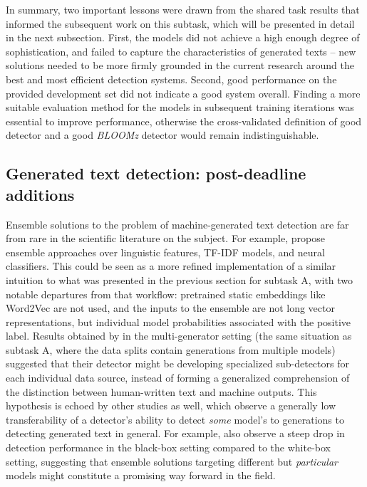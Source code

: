 In summary, two important lessons were drawn from the shared task results that informed the subsequent work on this subtask, which will be presented in detail in the next subsection.
First, the models did not achieve a high enough degree of sophistication, and failed to capture the characteristics of generated texts -- new solutions needed to be more firmly grounded in the current research around the best and most efficient detection systems.
Second, good performance on the provided development set did not indicate a good system overall.
Finding a more suitable evaluation method for the models in subsequent training iterations was essential to improve performance, otherwise the cross-validated definition of good detector and a good \emph{BLOOMz} detector would remain indistinguishable.

\subsection{Generated text detection: post-deadline additions}

Ensemble solutions to the problem of machine-generated text detection are far from rare in the scientific literature on the subject.
For example, \citet{frohling2021feature} propose ensemble approaches over linguistic features, TF-IDF models, and neural classifiers.
This could be seen as a more refined implementation of a similar intuition to what was presented in the previous section for subtask A, with two notable departures from that workflow: pretrained static embeddings like Word2Vec are not used, and the inputs to the ensemble are not  long vector representations, but individual model probabilities associated with the positive label.
Results obtained by \citet{frohling2021feature} in the multi-generator setting (the same situation as subtask A, where the data splits contain generations from multiple models) suggested that their detector might be developing specialized sub-detectors for each individual data source, instead of forming a generalized comprehension of the distinction between human-written text and machine outputs.
This hypothesis is echoed by other studies as well, which observe a generally low transferability of a detector's ability to detect \emph{some} model's to generations to detecting generated text in general.
For example, \citet{mitchell2023detectgpt} also observe a steep drop in detection performance in the black-box setting compared to the white-box setting, suggesting that ensemble solutions targeting different but \emph{particular} models might constitute a promising way forward in the field.

